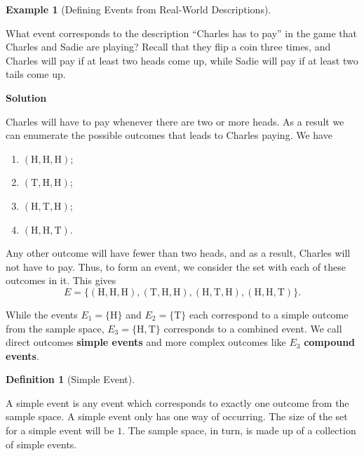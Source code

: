 \documentclass[
  letterpaper,
  DIV=11,
  numbers=noendperiod]{scrreprt}
\providecommand{\tightlist}{%
  \setlength{\itemsep}{0pt}\setlength{\parskip}{0pt}}\usepackage{longtable,booktabs,array}
\theoremstyle{definition}
\theoremstyle{definition}
\newtheorem{example}{Example}[chapter]
\theoremstyle{definition}
\newtheorem{definition}{Definition}[chapter]
\theoremstyle{remark}
\begin{document}
\begin{example}[Defining Events from Real-World
Descriptions]\protect\hypertarget{exm-event-conversion}{}\label{exm-event-conversion}

What event corresponds to the description ``Charles has to pay'' in the
game that Charles and Sadie are playing? Recall that they flip a coin
three times, and Charles will pay if at least two heads come up, while
Sadie will pay if at least two tails come up.

\begin{tcolorbox}[enhanced jigsaw, colback=white, colframe=quarto-callout-color-frame, arc=.35mm, leftrule=.75mm, rightrule=.15mm, opacityback=0, breakable, bottomrule=.15mm, left=2mm, toprule=.15mm]

\vspace{-3mm}\textbf{Solution}\vspace{3mm}

Charles will have to pay whenever there are two or more heads. As a
result we can enumerate the possible outcomes that leads to Charles
paying. We have

\begin{enumerate}
\def\labelenumi{\arabic{enumi}.}
\tightlist
\item
  \((\text{H},\text{H},\text{H})\);
\item
  \((\text{T},\text{H},\text{H})\);
\item
  \((\text{H},\text{T},\text{H})\);
\item
  \((\text{H},\text{H},\text{T})\).
\end{enumerate}

Any other outcome will have fewer than two heads, and as a result,
Charles will not have to pay. Thus, to form an event, we consider the
set with each of these outcomes in it. This gives
\[E = \{(\text{H},\text{H},\text{H}), (\text{T},\text{H},\text{H}), (\text{H},\text{T},\text{H}), (\text{H},\text{H},\text{T})\}.\]

\end{tcolorbox}

\end{example}

While the events \(E_1 = \{\text{H}\}\) and \(E_2 = \{\text{T}\}\) each
correspond to a simple outcome from the sample space,
\(E_3 = \{\text{H},\text{T}\}\) corresponds to a combined event. We call
direct outcomes \textbf{simple events} and more complex outcomes like
\(E_3\) \textbf{compound events}.

\begin{definition}[Simple
Event]\protect\hypertarget{def-simple-event}{}\label{def-simple-event}

A simple event is any event which corresponds to exactly one outcome
from the sample space. A simple event only has one way of occurring. The
size of the set for a simple event will be \(1\). The sample space, in
turn, is made up of a collection of simple events.

\end{definition}
\end{document}
